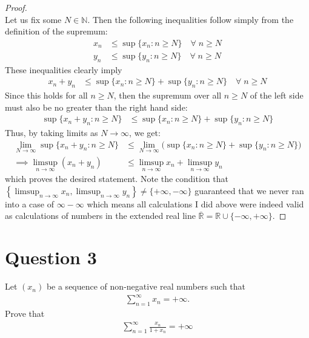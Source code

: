 \documentclass[10pt,a4paper]{article}
\theoremstyle{definition}
\theoremstyle{definition}
\begin{document}
\begin{proof}$ $
\\Let us fix some $N \in \mathbb{N}$. Then the following inequalities follow simply from the definition of the supremum:
\begin{align*}
x_n &\leq \sup \{x_n : n \geq N\} \quad \forall \; n \geq N\\
y_n &\leq \sup \{y_n : n \geq N\} \quad \forall \; n \geq N
\end{align*}
These inequalities clearly imply
\begin{align*}
x_n + y_n &\leq \sup \{x_n : n \geq N\} + \sup \{y_n : n \geq N\} \quad \forall \; n \geq N
\end{align*}
Since this holds for all $n \geq N$, then the supremum over all $n \geq N$ of the left side must also be no greater than the right hand side:
\begin{align*}
\sup\{x_n + y_n : n \geq N\} &\leq \sup \{x_n : n \geq N\} + \sup \{y_n : n \geq N\}
\end{align*}
Thus, by taking limits as $N \to \infty$, we get:
\begin{align*}
\lim_{N \to \infty} \sup\{x_n + y_n : n \geq N\} &\leq \lim_{N \to \infty}\bigg( \sup \{x_n : n \geq N\} + \sup \{y_n : n \geq N\}\bigg)\\
\implies \limsup_{n \to \infty} (x_n + y_n) &\leq \limsup_{n \to \infty} x_n + \limsup_{n \to \infty} y_n
\end{align*}
which proves the desired statement. Note the condition that $\left\{\limsup_{n \to \infty} x_n, \limsup_{n \to \infty} y_n \right\} \neq \{+\infty, -\infty\}$ guaranteed that we never ran into a case of $\infty - \infty$ which means all calculations I did above were indeed valid as calculations of numbers in the extended real line $\overline{\mathbb{R}} = \mathbb{R} \cup \{-\infty, +\infty\}$. 
\end{proof}

\section*{Question 3}
Let $(x_n)$ be a sequence of non-negative real numbers such that 
\begin{align*}
\sum_{n = 1}^\infty x_n = +\infty.
\end{align*}
Prove that 
\begin{align*}
\sum_{n = 1}^\infty \frac{x_n}{1 + x_n} = +\infty
\end{align*}
\end{document}

